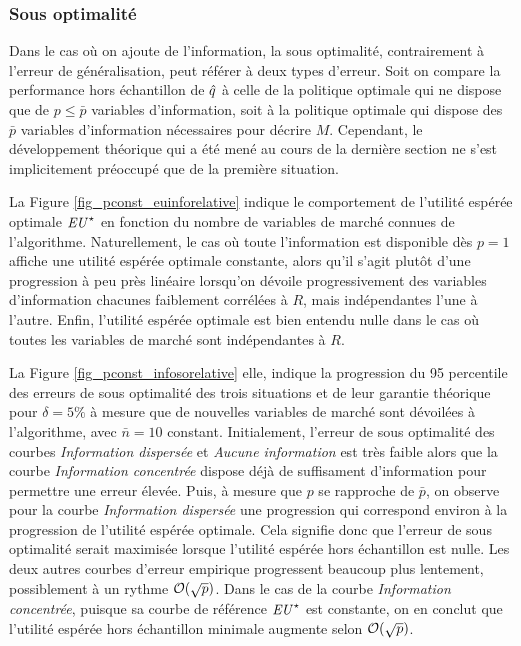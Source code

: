 \subsubsection{Sous optimalité}

Dans le cas où on ajoute de l'information, la sous optimalité, contrairement à l'erreur de
généralisation, peut référer à deux types d'erreur. Soit on compare la performance hors
échantillon de $\hat q$ à celle de la politique optimale qui ne dispose que de
$p \leq \bar p$ variables d'information, soit à la politique optimale qui dispose des
$\bar p$ variables d'information nécessaires pour décrire $M$. Cependant, le développement
théorique qui a été mené au cours de la dernière section ne s'est implicitement préoccupé
que de la première situation.

La Figure \ref{fig_pconst_euinforelative} indique le comportement de l'utilité espérée
optimale $\operatorname{\mbox{\textit{EU}}}^\star$ en fonction du nombre de variables de marché connues de
l'algorithme. Naturellement, le cas où toute l'information est disponible dès $p=1$
affiche une utilité espérée optimale constante, alors qu'il s'agit plutôt d'une
progression à peu près linéaire lorsqu'on dévoile progressivement des variables
d'information chacunes faiblement corrélées à $R$, mais indépendantes l'une à
l'autre. Enfin, l'utilité espérée optimale est bien entendu nulle dans le cas où toutes
les variables de marché sont indépendantes à $R$.

La Figure \ref{fig_pconst_infosorelative} elle, indique la progression du 95\ieme
percentile des erreurs de sous optimalité des trois situations et de leur garantie
théorique pour $\delta = 5\%$ à mesure que de nouvelles variables de marché sont dévoilées à
l'algorithme, avec $\bar n = 10$ constant. Initialement, l'erreur de sous optimalité des
courbes \textit{Information dispersée} et \textit{Aucune information} est très faible
alors que la courbe \textit{Information concentrée} dispose déjà de suffisament
d'information pour permettre une erreur élevée. Puis, à mesure que $p$ se rapproche de
$\bar p$, on observe pour la courbe \textit{Information dispersée} une progression qui
correspond environ à la progression de l'utilité espérée optimale. Cela signifie donc que
l'erreur de sous optimalité serait maximisée lorsque l'utilité espérée hors échantillon
est nulle. Les deux autres courbes d'erreur empirique progressent beaucoup plus lentement,
possiblement à un rythme $\mathcal O(\sqrt{p})$. Dans le cas de la courbe \textit{Information
  concentrée}, puisque sa courbe de référence $\operatorname{\mbox{\textit{EU}}}^\star$ est constante, on en conclut
que l'utilité espérée hors échantillon minimale augmente selon $\mathcal O(\sqrt{p})$. 

